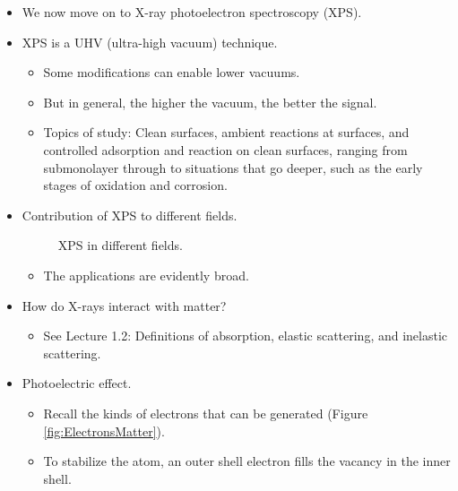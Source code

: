 \documentclass[../notes.tex]{subfiles}
\begin{document}
\begin{itemize}
\begin{itemize}
    \end{itemize}
    \item We now move on to X-ray photoelectron spectroscopy (XPS).
    \item XPS is a UHV (ultra-high vacuum) technique.
    \begin{itemize}
        \item Some modifications can enable lower vacuums.
        \item But in general, the higher the vacuum, the better the signal.
        \item Topics of study: Clean surfaces, ambient reactions at surfaces, and controlled adsorption and reaction on clean surfaces, ranging from submonolayer through to situations that go deeper, such as the early stages of oxidation and corrosion.
    \end{itemize}
    \item Contribution of XPS to different fields.
    \begin{figure}[h!]
        \centering
        \caption{XPS in different fields.}
        \label{fig:XPSFields}
    \end{figure}
    \begin{itemize}
        \item The applications are evidently broad.
    \end{itemize}
    \item How do X-rays interact with matter?
    \begin{itemize}
        \item See Lecture 1.2: Definitions of absorption, elastic scattering, and inelastic scattering.
    \end{itemize}
    \item Photoelectric effect.
    \begin{itemize}
        \item Recall the kinds of electrons that can be generated (Figure \ref{fig:ElectronsMatter}).
        \item To stabilize the atom, an outer shell electron fills the vacancy in the inner shell.

\end{itemize}
\end{itemize}
\end{document}
